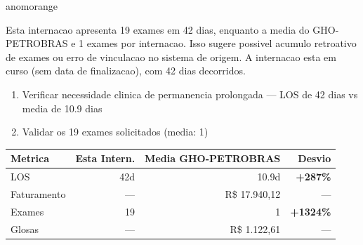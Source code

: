 \documentclass[a4paper,10pt]{article}
\begin{document}
\begin{anomalycard}[Internacao 164838 | GHO-PETROBRAS | ALTO (z=3.60)]{anomorange}
\vspace{2pt}\begin{tcolorbox}[colback=severityred!20,colframe=anomorange,title={\textbf{Interpretacao de Negocio}},fonttitle=\bfseries\small,left=4pt,right=4pt,top=3pt,bottom=3pt]
{\small Esta internacao apresenta 19 exames em 42 dias, enquanto a media do GHO-PETROBRAS e 1 exames por internacao. Isso sugere possivel acumulo retroativo de exames ou erro de vinculacao no sistema de origem. A internacao esta em curso (sem data de finalizacao), com 42 dias decorridos.}
\end{tcolorbox}
\begin{tcolorbox}[colback=severityyellow!30,colframe=anomorange,title={\textbf{Recomendacoes Especificas}},fonttitle=\bfseries\small,left=4pt,right=4pt,top=3pt,bottom=3pt]
\begin{enumerate}[nosep,leftmargin=16pt]
\item {\small Verificar necessidade clinica de permanencia prolongada --- LOS de 42 dias vs media de 10.9 dias}
\item {\small Validar os 19 exames solicitados (media: 1)}
\end{enumerate}
\end{tcolorbox}
\begin{center}\begin{tabular}{l r r r}\toprule\textbf{Metrica} & \textbf{Esta Intern.} & \textbf{Media GHO-PETROBRAS} & \textbf{Desvio} \\\midrule
LOS & 42d & 10.9d & \textcolor{anomred}{\textbf{+287\%}} \\
Faturamento & --- & R\$ 17.940,12 & --- \\
Exames & 19 & 1 & \textcolor{anomred}{\textbf{+1324\%}} \\
Glosas & --- & R\$ 1.122,61 & --- \\
\bottomrule\end{tabular}\end{center}


\end{anomalycard}
\end{document}
